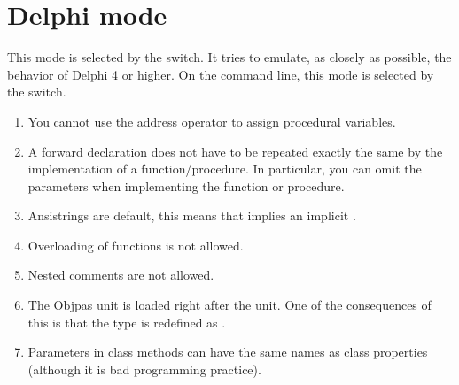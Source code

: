 \section{Delphi mode}
This mode is selected by the  switch. It tries to emulate,
as closely as possible, the behavior of Delphi 4 or higher. On the command line,
this mode is selected by the  switch.
\begin{enumerate}
\item You cannot use the address operator to assign procedural variables.
\item A forward declaration does not have to be repeated exactly the same by the
implementation of a function/procedure. In particular, you can omit the
parameters when implementing the function or procedure.
\item Ansistrings are default, this means that  implies
an implicit .
\item Overloading of functions is not allowed.
\item Nested comments are not  allowed.
\item The Objpas unit is loaded right after the  unit. One of the
consequences of this is that the type  is redefined as
.
\item Parameters in class methods can have the same names as class
properties (although it is bad programming practice).
\end{enumerate}


